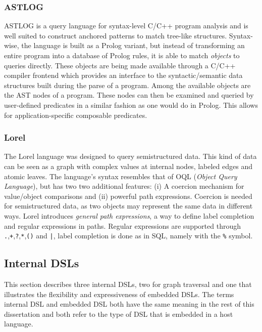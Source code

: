\subsubsection*{ASTLOG}
ASTLOG\cite{Crew:1997} is a query language for syntax-level C/C++ program analysis and is well suited to construct anchored patterns to match tree-like structures. Syntax-wise, the language is built as a Prolog variant, but instead of transforming an entire program into a database of Prolog rules, it is able to match \textit{objects} to queries directly. These objects are being made available through a C/C++ compiler frontend which provides an interface to the syntactic/semantic data structures built during the parse of a program. Among the available objects are the AST nodes of a program. These nodes can then be examined and queried by user-defined predicates in a similar fashion as one would do in Prolog. This allows for application-specific composable predicates. 

\subsubsection*{Lorel}
The Lorel language\cite{abiteboul1997lorel} was designed to query semistructured data. This kind of data can be seen as a graph with complex values at internal nodes, labeled edges and atomic leaves. The language's syntax resembles that of OQL (\textit{Object Query Language}), but has two two additional features: (i) A coercion mechanism for value/object comparisons and (ii) powerful path expressions. Coercion is needed for semistructured data, as two objects may represent the same data in different ways. Lorel introduces \textit{general path expressions}, a way to define label completion and regular expressions in paths. Regular expressions are supported through \texttt{.},\texttt{+},\texttt{?},\texttt{*},\texttt{()} and \texttt{|}, label completion is done as in SQL, namely with the \texttt{\%} symbol.



\subsection{Internal DSLs}
 This section describes three internal DSLs, two for graph traversal and one that illustrates the flexibility and expressiveness of embedded DSLs. The terms internal DSL and embedded DSL both have the same meaning in the rest of this dissertation and both refer to the type of DSL that is embedded in a host language.

